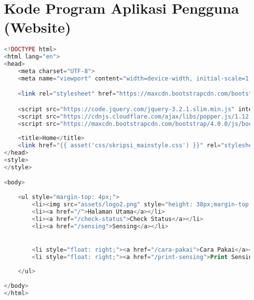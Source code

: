 \chapter{Kode Program Aplikasi Pengguna (Website)}
\label{lamp:C}

%
%
%

\begin{lstlisting}[language=PHP, caption=skripsi\_header.blade.php]
<!DOCTYPE html>
<html lang="en">
<head>
    <meta charset="UTF-8">
    <meta name="viewport" content="width=device-width, initial-scale=1.0, shrink-to-fit=no">

    <link rel="stylesheet" href="https://maxcdn.bootstrapcdn.com/bootstrap/4.0.0/css/bootstrap.min.css" integrity="sha384-Gn5384xqQ1aoWXA+058RXPxPg6fy4IWvTNh0E263XmFcJlSAwiGgFAW/dAiS6JXm" crossorigin="anonymous">

    <script src="https://code.jquery.com/jquery-3.2.1.slim.min.js" integrity="sha384-KJ3o2DKtIkvYIK3UENzmM7KCkRr/rE9/Qpg6aAZGJwFDMVNA/GpGFF93hXpG5KkN" crossorigin="anonymous"></script>
    <script src="https://cdnjs.cloudflare.com/ajax/libs/popper.js/1.12.9/umd/popper.min.js" integrity="sha384-ApNbgh9B+Y1QKtv3Rn7W3mgPxhU9K/ScQsAP7hUibX39j7fakFPskvXusvfa0b4Q" crossorigin="anonymous"></script>
    <script src="https://maxcdn.bootstrapcdn.com/bootstrap/4.0.0/js/bootstrap.min.js" integrity="sha384-JZR6Spejh4U02d8jOt6vLEHfe/JQGiRRSQQxSfFWpi1MquVdAyjUar5+76PVCmYl" crossorigin="anonymous"></script>
    
    <title>Home</title>
    <link href="{{ asset('css/skripsi_mainstyle.css') }}" rel="stylesheet" type="text/css" >
</head>
<style>
</style>

<body>
    
    <ul style="margin-top: 4px;">
        <li><img src="assets/logo2.png" style="height: 38px;margin-top: 8px;;"></li>
        <li><a href="/">Halaman Utama</a></li>
        <li><a href="/check-status">Check Status</a></li>
        <li><a href="/sensing">Sensing</a></li>


        <li style="float: right;"><a href="/cara-pakai">Cara Pakai</a></li>
        <li style="float: right;"><a href="/print-sensing">Print Sensing</a></li>
        
    </ul>
    
</body>
</html>
\end{lstlisting}

